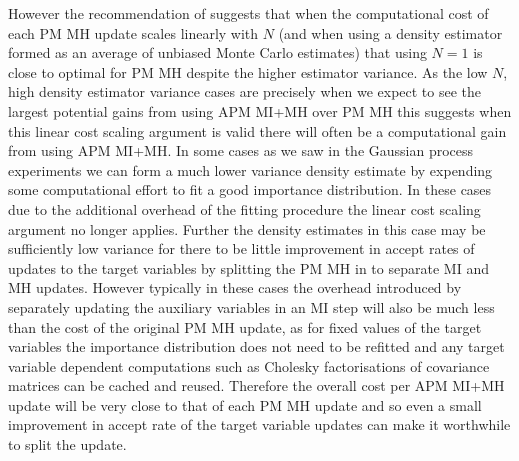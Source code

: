 However the recommendation of \citep{sherlock2016pseudo} suggests that when the computational cost of each \ac{PM} \ac{MH} update scales linearly with $N$ (and when using a density estimator formed as an average of unbiased Monte Carlo estimates) that using $N=1$ is close to optimal for \ac{PM} \ac{MH} despite the higher estimator variance. As the low $N$, high density estimator variance cases are precisely when we expect to see the largest potential gains from using \ac{APM} \ac{MI}+\ac{MH} over \ac{PM} \ac{MH} this suggests when this linear cost scaling argument is valid there will often be a computational gain from using \ac{APM} \ac{MI}+\ac{MH}. In some cases as we saw in the Gaussian process experiments we can form a much lower variance density estimate by expending some computational effort to fit a good importance distribution. In these cases due to the additional overhead of the fitting procedure the linear cost scaling argument no longer applies. Further the density estimates in this case may be sufficiently low variance for there to be little improvement in accept rates of updates to the target variables by splitting the \ac{PM} \ac{MH} in to separate \ac{MI} and \ac{MH} updates. However typically in these cases the overhead introduced by separately updating the auxiliary variables in an \ac{MI} step will also be much less than the cost of the original \ac{PM} \ac{MH} update, as for fixed values of the target variables the importance distribution does not need to be refitted and any target variable dependent computations such as Cholesky factorisations of covariance matrices can be cached and reused. Therefore the overall cost per \ac{APM} \ac{MI}+\ac{MH} update will be very close to that of each \ac{PM} \ac{MH} update and so even a small improvement in accept rate of the target variable updates can make it worthwhile to split the update.


